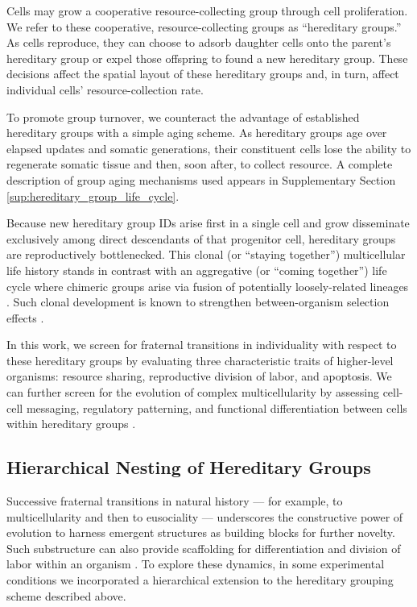 Cells may grow a cooperative resource-collecting group through cell proliferation.
We refer to these cooperative, resource-collecting groups as ``hereditary groups.''
As cells reproduce, they can choose to adsorb daughter cells onto the parent's hereditary group or expel those offspring to found a new hereditary group.
These decisions affect the spatial layout of these hereditary groups and, in turn, affect individual cells' resource-collection rate.

To promote group turnover, we counteract the advantage of established hereditary groups with a simple aging scheme.
As hereditary groups age over elapsed updates and somatic generations, their constituent cells lose the ability to regenerate somatic tissue and then, soon after, to collect resource.
A complete description of group aging mechanisms used appears in Supplementary Section \ref{sup:hereditary_group_life_cycle}.

Because new hereditary group IDs arise first in a single cell and grow disseminate exclusively among direct descendants of that progenitor cell, hereditary groups are reproductively bottlenecked.
This clonal (or ``staying together'') multicellular life history stands in contrast with an aggregative (or ``coming together'') life cycle where chimeric groups arise via fusion of potentially loosely-related lineages \citep{staps2019emergence}.
Such clonal development is known to strengthen between-organism selection effects \citep{grosberg2007evolution}.

In this work, we screen for fraternal transitions in individuality with respect to these hereditary groups by evaluating three characteristic traits of higher-level organisms: resource sharing, reproductive division of labor, and apoptosis.
We can further screen for the evolution of complex multicellularity by assessing cell-cell messaging, regulatory patterning, and functional differentiation between cells within hereditary groups \cite{knoll2011multiple}.

\subsection{Hierarchical Nesting of Hereditary Groups} \label{sec:hierarchical_nesting}

Successive fraternal transitions in natural history --- for example, to multicellularity and then to eusociality \citep{smith1997major} --- underscores the constructive power of evolution to harness emergent structures as building blocks for further novelty.
Such substructure can also provide scaffolding for differentiation and division of labor within an organism \citep{wilson1984relation}.
To explore these dynamics, in some experimental conditions we incorporated a hierarchical extension to the hereditary grouping scheme described above.

